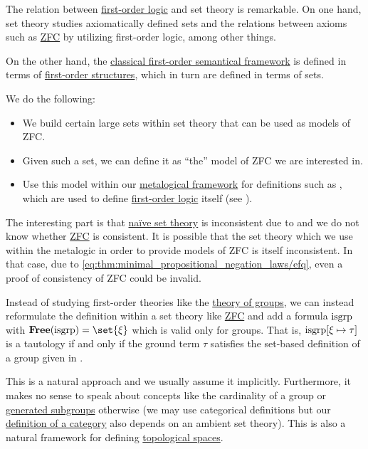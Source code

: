\begin{remark}\label{rem:set_definition_recursion}
  The relation between \hyperref[first_order_logic]{first-order logic} and set theory is remarkable. On one hand, set theory studies axiomatically defined sets and the relations between axioms such as \hyperref[def:zfc]{ZFC} by utilizing first-order logic, among other things.

  On the other hand, the \hyperref[def:first_order_semantics]{classical first-order semantical framework} is defined in terms of \hyperref[def:first_order_structure]{first-order structures}, which in turn are defined in terms of sets.

  We do the following:
  \begin{itemize}
    \item We build certain large sets within set theory that can be used as models of ZFC.
    \item Given such a set, we can define it as \enquote{the} model of ZFC we are interested in.
    \item Use this model within our \hyperref[rem:metalogic]{metalogical framework} for definitions such as , which are used to define \hyperref[sec:first_order_logic]{first-order logic} itself (see ).
  \end{itemize}

  The interesting part is that \hyperref[def:naive_set_theory]{na\"ive set theory} is inconsistent due to  and we do not know whether \hyperref[def:zfc]{ZFC} is consistent. It is possible that the set theory which we use within the metalogic in order to provide models of ZFC is itself inconsistent. In that case, due to \eqref{eq:thm:minimal_propositional_negation_laws/efq}, even a proof of consistency of ZFC could be invalid.
\end{remark}

\begin{remark}\label{rem:first_order_theories_in_zfc}
  Instead of studying first-order theories like the \hyperref[def:group/theory]{theory of groups}, we can instead reformulate the definition within a set theory like \hyperref[def:ZFC]{ZFC} and add a formula \( \operatorname{isgrp} \) with \( \boldop{Free}(\op{isgrp}) = \set{ \xi } \) which is valid only for groups. That is, \( \operatorname{isgrp}[\xi \mapsto \tau] \) is a tautology if and only if the ground term \( \tau \) satisfies the set-based definition of a group given in .

  This is a natural approach and we usually assume it implicitly. Furthermore, it makes no sense to speak about concepts like the cardinality of a group or \hyperref[def:first_order_generated_substructure]{generated subgroups} otherwise (we may use categorical definitions but our \hyperref[def:category]{definition of a category} also depends on an ambient set theory). This is also a natural framework for defining \hyperref[def:topological_space]{topological spaces}.
\end{remark}
